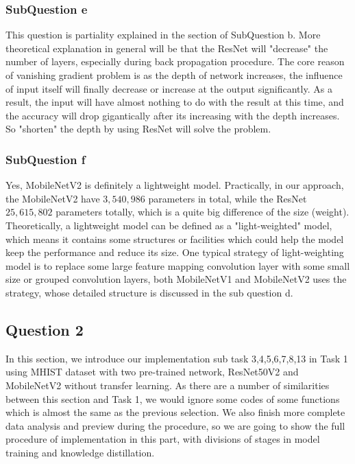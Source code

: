 \documentclass[conference]{IEEEtran}
\begin{document}
\subsubsection{SubQuestion e} %
This question is partiality explained in the section of SubQuestion b. More theoretical explanation in general will be that the ResNet will "decrease" the number of layers, especially during back propagation procedure. The core reason of vanishing gradient problem is as the depth of network increases, the influence of input itself will finally decrease or increase at the output significantly. As a result, the input will have almost nothing to do with the result at this time, and the accuracy will drop gigantically after its increasing with the depth increases. So "shorten" the depth by using ResNet will solve the problem.

\subsubsection{SubQuestion f} %
Yes, MobileNetV2 is definitely a lightweight model. Practically, in our approach, the MobileNetV2 have $3,540,986$ parameters in total, while the ResNet $25,615,802$ parameters totally, which is a quite big difference of the size (weight). Theoretically, a lightweight model can be defined as a "light-weighted" model, which means it contains some structures or facilities which could help the model keep the performance and reduce its size. One typical strategy of light-weighting model is to replace some large feature mapping convolution layer with some small size or grouped convolution layers, both MobileNetV1 and MobileNetV2 uses the strategy, whose detailed structure is discussed in the sub question d.

\subsection{Question 2} In this section, we introduce our implementation sub task 3,4,5,6,7,8,13 in Task 1 using MHIST dataset with two pre-trained network, ResNet50V2 and MobileNetV2 without transfer learning. As there are a number of similarities between this section and Task 1, we would ignore some codes of some functions which is almost the same as the previous selection. We also finish more complete data analysis and preview during the procedure, so we are going to show the full procedure of implementation in this part, with divisions of stages in model training and knowledge distillation.
\end{document}
